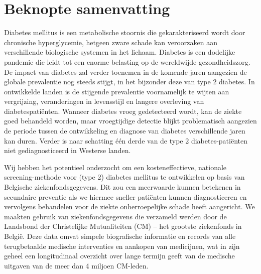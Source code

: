 \chapter*{Beknopte samenvatting}

Diabetes mellitus is een metabolische stoornis die gekarakteriseerd wordt door chronische hyperglycemie, hetgeen zware schade kan veroorzaken aan verschillende biologische systemen in het lichaam. Diabetes is een dodelijke pandemie die leidt tot een enorme belasting op de wereldwijde gezondheidszorg. De impact van diabetes zal verder toenemen in de komende jaren aangezien de globale prevalentie nog steeds stijgt, in het bijzonder deze van type 2 diabetes. In ontwikkelde landen is de stijgende prevalentie voornamelijk te wijten aan vergrijzing, veranderingen in levensstijl en langere overleving van diabetespati\"enten. Wanneer diabetes vroeg gedetecteerd wordt, kan de ziekte goed behandeld worden, maar vroegtijdige detectie blijkt problematisch aangezien de periode tussen de ontwikkeling en diagnose van diabetes verschillende jaren kan duren. Verder is naar schatting \'e\'en derde van de type 2 diabetes-pati\"enten niet gediagnosticeerd in Westerse landen.


Wij hebben het potentieel onderzocht om een kosteneffectieve, nationale screening-methode voor (type 2) diabetes mellitus te ontwikkelen op basis van Belgische ziekenfondsgegevens. Dit zou een meerwaarde kunnen betekenen in secundaire preventie als we hiermee sneller pati\"enten kunnen diagnosticeren en vervolgens behandelen voor de ziekte onherroepelijke schade heeft aangericht. We maakten gebruik van ziekenfondsgegevens die verzameld werden door de Landsbond der Christelijke Mutualiteiten (CM) -- het grootste ziekenfonds in Belgi\"e. Deze data omvat simpele biografische informatie en records van alle terugbetaalde medische interventies en aankopen van medicijnen, wat in zijn geheel een longitudinaal overzicht over lange termijn geeft van de medische uitgaven van de meer dan 4 miljoen CM-leden.

